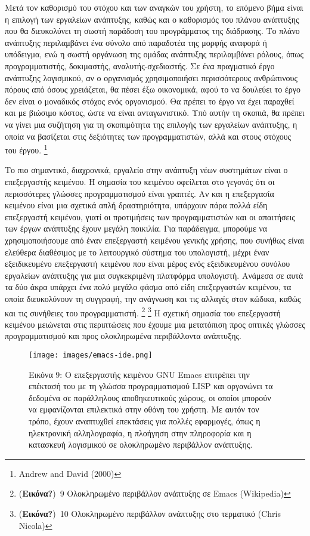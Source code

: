 \documentclass[
]{article}
\begin{document}
Μετά τον καθορισμό του στόχου και των αναγκών του χρήστη, το επόμενο
βήμα είναι η επιλογή των εργαλείων ανάπτυξης, καθώς και ο καθορισμός του
πλάνου ανάπτυξης που θα διευκολύνει τη σωστή παράδοση του προγράμματος
της διάδρασης. Το πλάνο ανάπτυξης περιλαμβάνει ένα σύνολο από παραδοτέα
της μορφής αναφορά ή υπόδειγμα, ενώ η σωστή οργάνωση της ομάδας
ανάπτυξης περιλαμβάνει ρόλους, όπως προγραμματιστής, δοκιμαστής,
αναλυτής-σχεδιαστής. Σε ένα πραγματικό έργο ανάπτυξης λογισμικού, αν ο
οργανισμός χρησιμοποιήσει περισσότερους ανθρώπινους πόρους από όσους
χρειάζεται, θα πέσει έξω οικονομικά, αφού το να δουλεύει το έργο δεν
είναι ο μοναδικός στόχος ενός οργανισμού. Θα πρέπει το έργο να έχει
παραχθεί και με βιώσιμο κόστος, ώστε να είναι ανταγωνιστικό. Υπό αυτήν
τη σκοπιά, θα πρέπει να γίνει μια συζήτηση για τη σκοπιμότητα της
επιλογής των εργαλείων ανάπτυξης, η οποία να βασίζεται στις δεξιότητες
των προγραμματιστών, αλλά και στους στόχους του έργου. \footnote{Andrew
  and David (2000)}

Το πιο σημαντικό, διαχρονικά, εργαλείο στην ανάπτυξη νέων συστημάτων
είναι ο επεξεργαστής κειμένου. Η σημασία του κειμένου οφείλεται στο
γεγονός ότι οι περισσότερες γλώσσες προγραμματισμού είναι γραπτές. Αν
και η επεξεργασία κειμένου είναι μια σχετικά απλή δραστηριότητα,
υπάρχουν πάρα πολλά είδη επεξεργαστή κειμένου, γιατί οι προτιμήσεις των
προγραμματιστών και οι απαιτήσεις των έργων ανάπτυξης έχουν μεγάλη
ποικιλία. Για παράδειγμα, μπορούμε να χρησιμοποιήσουμε από έναν
επεξεργαστή κειμένου γενικής χρήσης, που συνήθως είναι ελεύθερα
διαθέσιμος με το λειτουργικό σύστημα του υπολογιστή, μέχρι έναν
εξειδικευμένο επεξεργαστή κειμένου που είναι μέρος ενός εξειδικευμένου
συνόλου εργαλείων ανάπτυξης για μια συγκεκριμένη πλατφόρμα υπολογιστή.
Ανάμεσα σε αυτά τα δύο άκρα υπάρχει ένα πολύ μεγάλο φάσμα από είδη
επεξεργαστών κειμένου, τα οποία διευκολύνουν τη συγγραφή, την ανάγνωση
και τις αλλαγές στον κώδικα, καθώς και τις συνήθειες του προγραμματιστή.
\footnote{(\textbf{Εικόνα?})~9 Ολοκληρωμένο περιβάλλον ανάπτυξης σε
  Emacs (Wikipedia)} \footnote{(\textbf{Εικόνα?})~10 Ολοκληρωμένο
  περιβάλλον ανάπτυξης στο τερματικό (Chris Nicola)} Η σχετική σημασία
του επεξεργαστή κειμένου μειώνεται στις περιπτώσεις που έχουμε μια
μετατόπιση προς οπτικές γλώσσες προγραμματισμού και προς ολοκληρωμένα
περιβάλλοντα ανάπτυξης.

\leavevmode{}%
\begin{figure}
\hypertarget{fig:emacs-ide}{%
\centering
\texttt{[image: images/emacs-ide.png]}
\caption{Εικόνα 9: Ο επεξεργαστής κειμένου GNU Emacs επιτρέπει την
επέκτασή του με τη γλώσσα προγραμματισμού LISP και οργανώνει τα δεδομένα
σε παράλληλους αποθηκευτικούς χώρους, οι οποίοι μπορούν να εμφανίζονται
επιλεκτικά στην οθόνη του χρήστη. Με αυτόν τον τρόπο, έχουν αναπτυχθεί
επεκτάσεις για πολλές εφαρμογές, όπως η ηλεκτρονική αλληλογραφία, η
πλοήγηση στην πληροφορία και η κατασκευή λογισμικού σε ολοκληρωμένο
περιβάλλον ανάπτυξης.}\label{fig:emacs-ide}
}
\end{figure}
\end{document}
